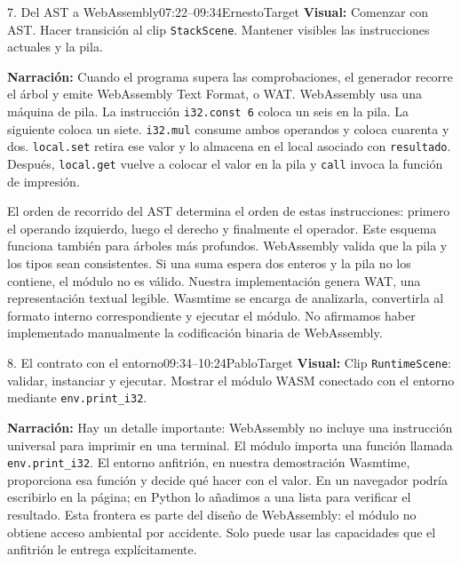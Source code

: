 \documentclass[11pt,letterpaper]{article}
\newcommand{\visual}[1]{\textbf{Visual:} #1}
\begin{document}
\begin{segmento}{7. Del AST a WebAssembly}{07:22--09:34}{Ernesto}{Target}
\visual{Comenzar con AST. Hacer transición al clip \texttt{StackScene}. Mantener visibles las instrucciones actuales y la pila.}

\textbf{Narración:} Cuando el programa supera las comprobaciones, el generador recorre el árbol y emite WebAssembly Text Format, o WAT. WebAssembly usa una máquina de pila. La instrucción \texttt{i32.const 6} coloca un seis en la pila. La siguiente coloca un siete. \texttt{i32.mul} consume ambos operandos y coloca cuarenta y dos. \texttt{local.set} retira ese valor y lo almacena en el local asociado con \texttt{resultado}. Después, \texttt{local.get} vuelve a colocar el valor en la pila y \texttt{call} invoca la función de impresión.

El orden de recorrido del AST determina el orden de estas instrucciones: primero el operando izquierdo, luego el derecho y finalmente el operador. Este esquema funciona también para árboles más profundos. WebAssembly valida que la pila y los tipos sean consistentes. Si una suma espera dos enteros y la pila no los contiene, el módulo no es válido. Nuestra implementación genera WAT, una representación textual legible. Wasmtime se encarga de analizarla, convertirla al formato interno correspondiente y ejecutar el módulo. No afirmamos haber implementado manualmente la codificación binaria de WebAssembly.
\end{segmento}

\begin{segmento}{8. El contrato con el entorno}{09:34--10:24}{Pablo}{Target}
\visual{Clip \texttt{RuntimeScene}: validar, instanciar y ejecutar. Mostrar el módulo WASM conectado con el entorno mediante \texttt{env.print\_i32}.}

\textbf{Narración:} Hay un detalle importante: WebAssembly no incluye una instrucción universal para imprimir en una terminal. El módulo importa una función llamada \texttt{env.print\_i32}. El entorno anfitrión, en nuestra demostración Wasmtime, proporciona esa función y decide qué hacer con el valor. En un navegador podría escribirlo en la página; en Python lo añadimos a una lista para verificar el resultado. Esta frontera es parte del diseño de WebAssembly: el módulo no obtiene acceso ambiental por accidente. Solo puede usar las capacidades que el anfitrión le entrega explícitamente.
\end{segmento}
\end{document}
